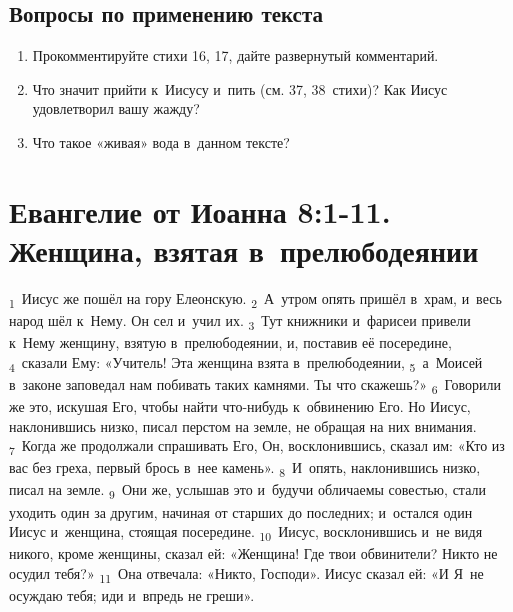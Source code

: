 \documentclass[a4paper,12pt]{article}
\begin{document}
\subsection*{Вопросы по применению текста} 
\begin{enumerate}
    \item Прокомментируйте стихи 16, 17, дайте развернутый комментарий.
    
    \myline
    
    \myline
    \item Что значит прийти к~Иисусу и~пить (см. 37, 38~стихи)? Как Иисус удовлетворил вашу жажду? 
    
    \myline
    
    \myline
    \item Что такое «живая» вода в~данном тексте? 
    
    \myline
    
    \myline
\end{enumerate}


\section{Евангелие от Иоанна 8:1-11. Женщина, взятая в~прелюбодеянии}

\textsubscript{1}~Иисус же пошёл на гору Елеонскую. \textsubscript{2}~А~утром опять пришёл в~храм, и~весь народ шёл к~Нему. Он сел и~учил их. \textsubscript{3}~Тут книжники и~фарисеи привели к~Нему женщину, взятую в~прелюбодеянии, и, поставив её посередине, \textsubscript{4}~сказали Ему: «Учитель! Эта женщина взята в~прелюбодеянии, \textsubscript{5}~а~Моисей в~законе заповедал нам побивать таких камнями. Ты что скажешь?» \textsubscript{6}~Говорили же это, искушая Его, чтобы найти что-нибудь к~обвинению Его. Но Иисус, наклонившись низко, писал перстом на земле, не обращая на них внимания. \textsubscript{7}~Когда же продолжали спрашивать Его, Он, восклонившись, сказал им: «Кто из вас без греха, первый брось в~нее камень». \textsubscript{8}~И~опять, наклонившись низко, писал на земле. \textsubscript{9}~Они же, услышав это и~будучи обличаемы совестью, стали уходить один за другим, начиная от старших до последних; и~остался один Иисус и~женщина, стоящая посередине. \textsubscript{10}~Иисус, восклонившись и~не видя никого, кроме женщины, сказал ей: «Женщина! Где твои обвинители? Никто не осудил тебя?» \textsubscript{11}~Она отвечала: «Никто, Господи». Иисус сказал ей: «И Я~не осуждаю тебя; иди и~впредь не греши». 
\end{document}
